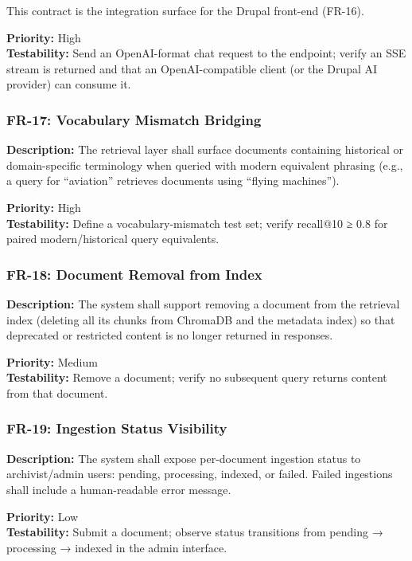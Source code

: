 \documentclass[
  11pt,
]{article}
\begin{document}
This contract is the integration surface for the Drupal front-end
(FR-16).

\textbf{Priority:} High\\
\textbf{Testability:} Send an OpenAI-format chat request to the
endpoint; verify an SSE stream is returned and that an OpenAI-compatible
client (or the Drupal AI provider) can consume it.

\subsubsection{FR-17: Vocabulary Mismatch
Bridging}\label{fr-17-vocabulary-mismatch-bridging}

\textbf{Description:} The retrieval layer shall surface documents
containing historical or domain-specific terminology when queried with
modern equivalent phrasing (e.g., a query for ``aviation'' retrieves
documents using ``flying machines'').

\textbf{Priority:} High\\
\textbf{Testability:} Define a vocabulary-mismatch test set; verify
recall@10 ≥ 0.8 for paired modern/historical query equivalents.

\subsubsection{FR-18: Document Removal from
Index}\label{fr-18-document-removal-from-index}

\textbf{Description:} The system shall support removing a document from
the retrieval index (deleting all its chunks from ChromaDB and the
metadata index) so that deprecated or restricted content is no longer
returned in responses.

\textbf{Priority:} Medium\\
\textbf{Testability:} Remove a document; verify no subsequent query
returns content from that document.

\subsubsection{FR-19: Ingestion Status
Visibility}\label{fr-19-ingestion-status-visibility}

\textbf{Description:} The system shall expose per-document ingestion
status to archivist/admin users: pending, processing, indexed, or
failed. Failed ingestions shall include a human-readable error message.

\textbf{Priority:} Low\\
\textbf{Testability:} Submit a document; observe status transitions from
pending → processing → indexed in the admin interface.
\end{document}
